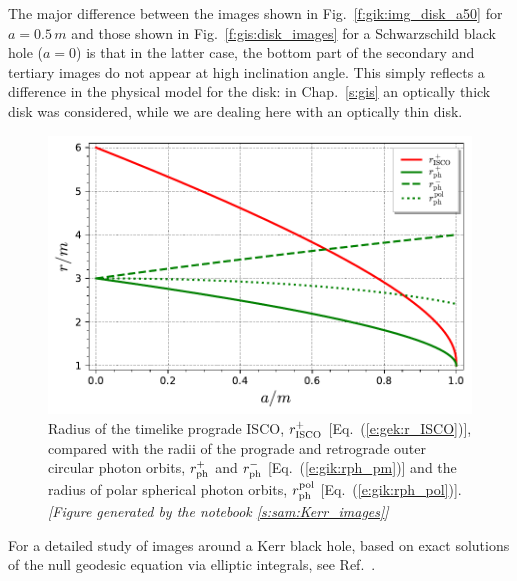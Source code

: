 The major difference between the images shown in Fig.~\ref{f:gik:img_disk_a50}
for $a=0.5\, m$ and those shown in Fig.~\ref{f:gis:disk_images} for
a Schwarzschild black hole ($a=0$) is that in the latter case, the
bottom part of the secondary and tertiary images do not appear at high inclination
angle. This simply reflects a difference in the physical model for the disk:
in Chap.~\ref{s:gis} an optically thick disk was considered, while we are
dealing here with an optically thin disk.






\begin{figure}
\centerline{\includegraphics[height=0.28\textheight]{gik_rISCO_rph.pdf}}
\caption[]{\label{f:gik:rISCO_rph} \footnotesize
Radius of the timelike prograde ISCO, $r_{\rm ISCO}^+$ [Eq.~(\ref{e:gek:r_ISCO})], compared
with the radii of the prograde and retrograde outer circular photon orbits, $r_{\rm ph}^+$
and $r_{\rm ph}^-$ [Eq.~(\ref{e:gik:rph_pm})] and
the radius of polar spherical photon orbits, $r_{\rm ph}^{\rm pol}$ [Eq.~(\ref{e:gik:rph_pol})].
\textsl{[Figure generated by the notebook \ref{s:sam:Kerr_images}]}
}
\end{figure}


For a detailed study of images around a Kerr black hole, based on exact
solutions of the null geodesic equation via elliptic integrals, see Ref.~\cite{GrallL20a}.





